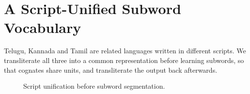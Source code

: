 \chapter{A Script-Unified Subword Vocabulary}
\label{ch:method}

Telugu, Kannada and Tamil are related languages written in different scripts. We transliterate
all three into a common representation before learning subwords, so that cognates share units,
and transliterate the output back afterwards.

\begin{figure}[htbp]
  \centering
  \caption{Script unification before subword segmentation.}
  \label{fig:unify}
\end{figure}
